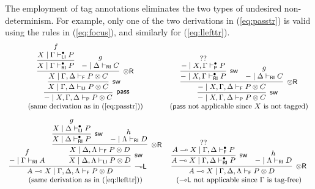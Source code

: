\documentclass[copyright,creativecommons]{eptcs}
\theoremstyle{definition}
\newcommand{\tr}{\otimes \mathsf{R}}
\newcommand{\lleft}{{\multimap}\mathsf{L}}
\newcommand{\pass}{\mathsf{pass}}
\newcommand{\ot}{\otimes}
\newcommand{\lolli}{\multimap}
\newcommand{\RI}{\mathsf{RI}}
\newcommand{\LI}{\mathsf{LI}}
\newcommand{\Pass}{\mathsf{P}}
\newcommand{\F}{\mathsf{F}}
\begin{document}
The employment of tag annotations eliminates the two types of undesired non-determinism. For example, only one of the two derivations in (\ref{eq:passtr}) is valid using the rules in (\ref{eq:focus}), and similarly for (\ref{eq:llefttr}).
\begin{displaymath}
\small
  \begin{array}{cc}
      \infer[\pass]{{-} \mid X , \Gamma , \Delta \vdash_{\Pass} P \ot C}{
        \infer[\mathsf{sw}]{X \mid \Gamma , \Delta \vdash_{\LI} P \ot C}{
          \infer[\tr]{X \mid \Gamma , \Delta \vdash_{\F} P \ot C}{
            \infer{X \mid \Gamma \vdash^{\bullet}_{\RI} P}{
              \deduce{X \mid \Gamma \vdash^{\bullet}_{\LI} P}{f}
              }
            &
            \deduce{{-} \mid \Delta \vdash_{\RI} C}{g}
          }
        }
      }
    &
    \infer[\mathsf{sw}]{{-} \mid X , \Gamma , \Delta \vdash_{\Pass} P \ot C}{
      \infer[\tr]{{-} \mid X , \Gamma , \Delta \vdash_{\F} P \ot C}{
        \infer[\mathsf{sw}]{{-} \mid X , \Gamma \vdash^{\bullet}_{\RI} P}{
          \deduce{{-} \mid X , \Gamma \vdash^{\bullet}_{\Pass} P}{??}
        }
        &
        \deduce{{-} \mid \Delta \vdash_{\RI} C}{g}
      }
    }
    \\
    (\text{same derivation as in (\ref{eq:passtr})})
    &
    (\text{$\pass$ not applicable since $X$ is not tagged})
    \\[10pt]
      \infer[\lleft]{A \lolli X \mid \Gamma , \Delta , \Lambda \vdash_{\F} P \ot D}{
        \deduce{{-} \mid \Gamma \vdash_{\RI} A}{f}
        &
        \infer[\mathsf{sw}]{X \mid \Delta , \Lambda \vdash_{\LI} P \ot D}{
          \infer[\tr]{X \mid \Delta , \Lambda \vdash_{\F} P \ot D}{
            \infer[\mathsf{sw}]{X \mid \Delta \vdash^{\bullet}_{\RI} P}{
              \deduce{X \mid \Delta \vdash^{\bullet}_{\LI} P}{g}
              }
            &
            \deduce{{-} \mid \Lambda \vdash_{\RI} D}{h}
          }
        }
      }
    &
      \infer[\tr]{A \lolli X \mid \Gamma , \Delta , \Lambda \vdash_{\F} P \ot D}{
        \infer[\mathsf{sw}]{A \lolli X \mid \Gamma , \Delta \vdash^{\bullet}_{\RI} P}{
          \deduce{A \lolli X \mid \Gamma , \Delta \vdash^{\bullet}_{\F} P}{??}
        }
        &
        \deduce{{-} \mid \Lambda \vdash_{\RI} D}{h}
      }
    \\
    (\text{same derivation as in (\ref{eq:llefttr})})
    &
    (\text{$\lleft$ not applicable since $\Gamma$ is tag-free})
   \end{array}
  \end{displaymath}
\end{document}
